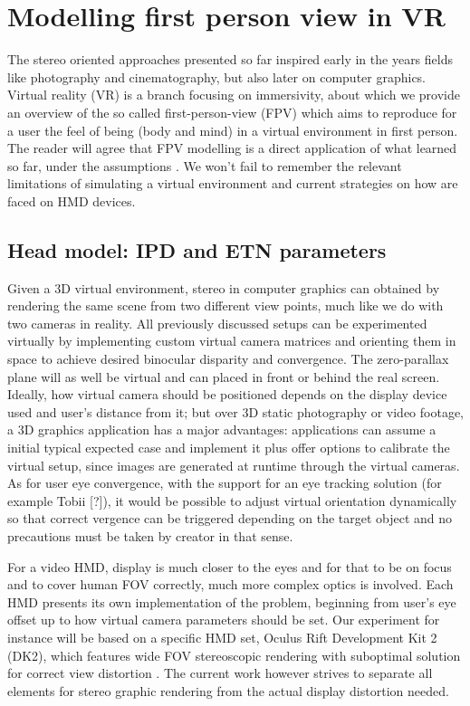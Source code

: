 \section{Modelling first person view in VR}

The stereo oriented approaches presented so far inspired early in the years fields like photography and cinematography, but also later on computer graphics. Virtual reality (VR) is a branch focusing on immersivity, about which we provide an overview of the so called first-person-view (FPV) which aims to reproduce for a user the feel of being (body and mind) in a virtual environment in first person. The reader will agree that FPV modelling is a direct application of what learned so far, under the assumptions . We won't fail to remember  the relevant limitations of simulating a virtual environment and current strategies on how are faced on HMD devices.

\subsection{Head model: IPD and ETN parameters}
Given a 3D virtual environment, stereo in computer graphics can obtained by rendering the same scene from two different view points, much like we do with two cameras in reality. All previously discussed setups can be experimented virtually by implementing custom virtual camera matrices and orienting them in space to achieve desired binocular disparity and convergence. The zero-parallax plane will as well be virtual and can placed in front or behind the real screen. Ideally, how virtual camera should be positioned depends on the display device used and user's distance from it; but over 3D static photography or video footage, a 3D graphics application has a major advantages: applications can assume a initial typical expected case and implement it plus offer options to calibrate the virtual setup, since images are generated at runtime through the virtual cameras. As for user eye convergence, with the support for an eye tracking solution (for example Tobii [?]), it would be possible to adjust virtual orientation dynamically so that correct vergence can be triggered depending on the target object and no precautions must be taken by creator in that sense.

For a video HMD, display is much closer to the eyes and for that to be on focus and to cover human FOV correctly, much more complex optics is involved. Each HMD presents its own implementation of the problem, beginning from user's eye offset up to how virtual camera parameters should be set. Our experiment for instance will be based on a specific HMD set, Oculus Rift Development Kit 2 (DK2), which features wide FOV stereoscopic rendering with suboptimal solution for correct view distortion \cite{link_oculus_limits}. The current work however strives to separate all elements for stereo graphic rendering from the actual display distortion needed.


